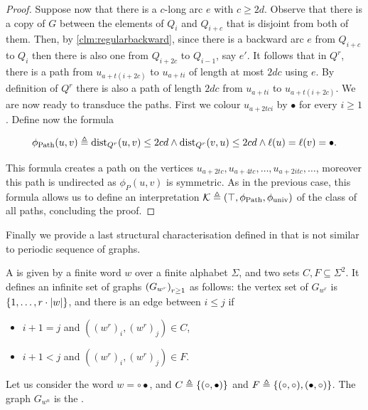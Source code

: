 \begin{proof}
Suppose now that there is a $c$-long arc $e$ with $c\geq 2d$. Observe that there is a copy of $G$ between the elements of $Q_i$ and $Q_{i+c}$ that is disjoint from both of them.
Then, by \cref{clm:regularbackward}, since there is a backward arc $e$ from $Q_{i+c}$ to $Q_i$ then there is also one from $Q_{i+2c}$ to $Q_{i-1}$, say $e'$. 
It follows that in $Q^r$, there is a path from $u_{a+t(i+2c)}$ to $u_{a+ti}$ of length at most $2dc$ using $e$. By definition of $Q^r$ there is also a path of length $2dc$ from $u_{a+ti}$ to $u_{a+t(i+2c)}$.
We are now ready to transduce the paths. First we colour $u_{a+2tci}$ by $\bullet$ for every $i\geq 1$. Define now the formula

\begin{equation}
  \phi_{\operatorname{Path}}(u,v)  \triangleq \operatorname{dist}_{Q^r}(u,v)\leq 2cd \land 
  \operatorname{dist}_{Q^r}(v,u)\leq 2cd \land 
  \ell(u) = \ell(v) = \bullet.
\end{equation}

This formula creates a path on the vertices $u_{a+2tc}, u_{a+4tc},\dots, u_{a+2itc}, \dots$, moreover this path
is undirected as $\phi_P(u,v)$ is symmetric. As in the previous case, this formula allows us to define an interpretation $\mathcal{K}
\triangleq (\top, \phi_{\operatorname{Path}}, \phi_{\text{univ}})$ of the class of all paths, concluding the proof.
\end{proof}

\AP Finally we provide a last structural characterisation defined in
\cite[Section 7]{ALM17} that is not  similar
to periodic sequence of graphs. 

\begin{definition}
  \label{def:periodic-sequence}
  A  is given by a finite word $w$
  over a finite alphabet $\Sigma$, and two sets $C, F \subseteq \Sigma^2$. It defines
  an infinite set of graphs $\seqof{G_{w^r}}[r \geq 1]$ as follows:
  the vertex set of $G_{w^r}$ is $\{ 1, \ldots, r \cdot |w| \}$, and there is an edge
  between $i \leq j$ if 
  \begin{itemize}
    \item $i + 1 = j$ and $((w^r)_i, (w^r)_j) \in C$,
    \item $i + 1 < j$ and $((w^r)_i, (w^r)_j) \in F$.
  \end{itemize}
\end{definition}

\begin{example}
  \label{ex:periodic-sequence}
  Let us consider the word $w = \circ \bullet$, and 
  $C \triangleq \{ (\circ,\bullet) \}$ and $F \triangleq \{ (\circ,\circ), (\bullet,\circ) \}$.
  The graph $G_{w^n}$ is the . 
\end{example}

